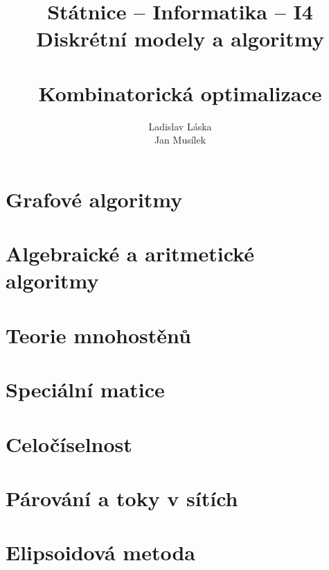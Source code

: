 \documentclass[a4paper,12pt,titlepage]{article}
\title{Státnice -- Informatika -- I4\\ Diskrétní modely a algoritmy\\ ~\\ 
Kombinatorická optimalizace}
\author{Ladislav Láska\\ Jan Musílek}
\begin{document}
\maketitle
\newpage
\tableofcontents
\newpage

\section{Grafové algoritmy}
\section{Algebraické a aritmetické algoritmy}
\section{Teorie mnohostěnů}

\section{Speciální matice}
\section{Celočíselnost}
\section{Párování a toky v sítích}

\section{Elipsoidová metoda}
\end{document}
